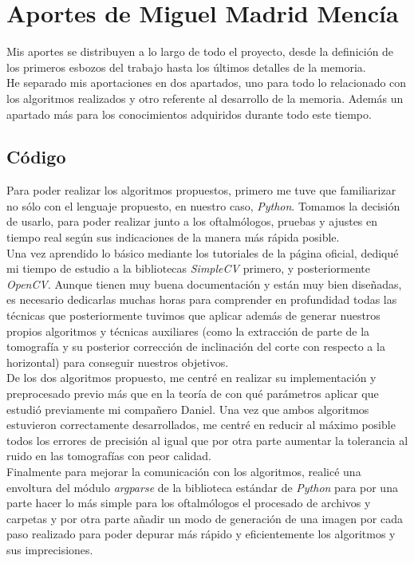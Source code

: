 \section{Aportes de Miguel Madrid Mencía}
Mis aportes se distribuyen a lo largo de todo el proyecto, desde la
definición de los primeros esbozos del trabajo hasta los últimos
detalles de la memoria.\\
He separado mis aportaciones en dos apartados, uno para todo lo
relacionado con los algoritmos realizados y otro referente al
desarrollo de la memoria. Además un apartado más para los
conocimientos adquiridos durante todo este tiempo.

\subsection{Código}
Para poder realizar los algoritmos propuestos, primero me tuve que
familiarizar no sólo con el lenguaje propuesto, en nuestro caso,
\emph{Python}. Tomamos la decisión de usarlo, para poder realizar
junto a los oftalmólogos, pruebas y ajustes en tiempo real según sus
indicaciones de la manera más rápida posible.\\
Una vez aprendido lo básico mediante los tutoriales de la página
oficial, dediqué mi tiempo de estudio a la bibliotecas \emph{SimpleCV}
primero, y posteriormente \emph{OpenCV}. Aunque tienen muy buena
documentación y están muy bien diseñadas, es necesario dedicarlas
muchas horas para comprender en profundidad todas las técnicas que
posteriormente tuvimos que aplicar además de generar nuestros propios
algoritmos y técnicas auxiliares (como la extracción de parte de la
tomografía y su posterior corrección de inclinación del corte con
respecto a la horizontal) para conseguir nuestros objetivos.\\
De los dos algoritmos propuesto, me centré en realizar su
implementación y preprocesado previo más que en la teoría de con qué
parámetros aplicar que estudió previamente mi compañero Daniel. Una
vez que ambos algoritmos estuvieron correctamente desarrollados, me
centré en reducir al máximo posible todos los errores de precisión al
igual que por otra parte aumentar la tolerancia al ruido en las
tomografías con peor calidad.\\
Finalmente para mejorar la comunicación con los algoritmos, realicé
una envoltura del módulo \emph{argparse} de la biblioteca estándar de
\emph{Python} para por una parte hacer lo más simple para los
oftalmólogos el procesado de archivos y carpetas y por otra parte
añadir un modo de generación de una imagen por cada paso realizado
para poder depurar más rápido y eficientemente los algoritmos y sus
imprecisiones.

